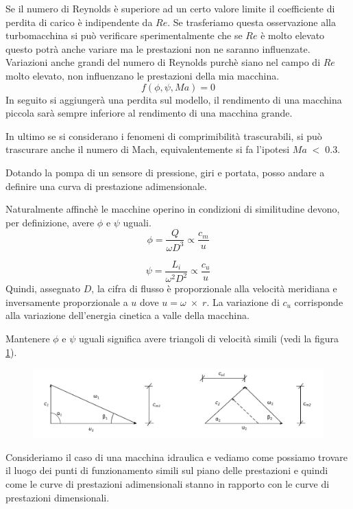 Se il numero di Reynolds è superiore ad un certo valore limite il coefficiente di perdita di carico è indipendente da $Re$. Se trasferiamo questa osservazione alla turbomacchina si può verificare sperimentalmente che se $Re$ è molto elevato questo potrà anche variare ma le prestazioni non ne saranno influenzate. Variazioni anche grandi del numero di Reynolds purchè siano nel
campo di $Re$ molto elevato, non influenzano le prestazioni della mia macchina.
\begin{equation}
f(\phi,\psi,Ma)=0
\end{equation}
In seguito si aggiungerà una perdita sul modello, il rendimento di una macchina piccola sarà sempre inferiore al rendimento di una macchina grande.

In ultimo se si considerano i fenomeni di comprimibilità trascurabili, si può trascurare anche il numero di Mach, equivalentemente si fa l'ipotesi $Ma\;<\;0.3$.

Dotando la pompa di un sensore di pressione, giri e portata, posso andare a definire una curva di prestazione adimensionale.

Naturalmente affinchè le macchine operino in condizioni di similitudine devono, per definizione, avere $\phi$ e $\psi$ uguali. 
\begin{equation}
\phi=\frac{Q}{\omega D^3} \propto \frac{c_m}{u}
\end{equation}

\begin{equation}
\psi = \frac{L_i}{\omega^2 D^2} \propto \frac{c_u}{u}
\end{equation}
Quindi, assegnato $D$, la cifra di flusso è proporzionale alla velocità meridiana e inversamente proporzionale a $u$ dove $u=\omega \; \times \; r$. La variazione di $c_u$ corrisponde alla variazione dell'energia cinetica a valle della macchina. 

Mantenere $\phi$ e $\psi$ uguali significa avere triangoli di velocità simili (vedi la figura \ref{fig:tria}).
\begin{figure}
\centering
  \includegraphics[width=.8\textwidth]{fig/triang.pdf}
\caption{}
\label{fig:tria}
\end{figure}
Consideriamo il caso di una macchina idraulica e vediamo come possiamo trovare il luogo dei punti di funzionamento simili sul piano delle prestazioni e quindi come le curve di prestazioni adimensionali stanno in rapporto con le curve di prestazioni dimensionali.

